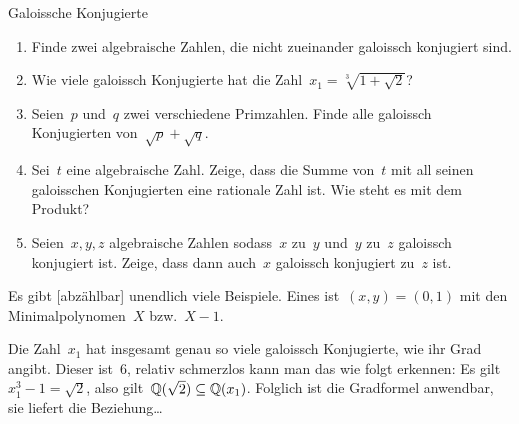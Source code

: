 \documentclass{algblatt}
\begin{document}
\begin{aufgabe}{Galoissche Konjugierte}
\begin{enumerate}
\item Finde zwei algebraische Zahlen, die nicht zueinander galoissch konjugiert
sind.
\item Wie viele galoissch Konjugierte hat die Zahl~$x_1 = \sqrt[3]{1 +
\sqrt{2}}$?
\item Seien~$p$ und~$q$ zwei verschiedene Primzahlen. Finde alle galoissch
Konjugierten von~$\sqrt{p} + \sqrt{q}$.
\item Sei~$t$ eine algebraische Zahl. Zeige, dass die Summe von~$t$ mit all
seinen galoisschen Konjugierten eine rationale Zahl ist. Wie steht es mit dem
Produkt?
\item Seien~$x, y, z$ algebraische Zahlen sodass~$x$ zu~$y$ und~$y$ zu~$z$
galoissch konjugiert ist. Zeige, dass dann auch~$x$ galoissch konjugiert zu~$z$
ist.
\end{enumerate}

\begin{loesungE}
\item Es gibt [abzählbar] unendlich viele Beispiele. Eines ist~$(x,y) = (0,1)$
mit den Minimalpolynomen~$X$ bzw.~$X-1$.

\item Die Zahl~$x_1$ hat insgesamt genau so viele galoissch Konjugierte, wie
ihr Grad angibt. Dieser ist~$6$, relativ schmerzlos kann man das wie folgt
erkennen: Es gilt~$x_1^3 - 1 = \sqrt{2}$, also gilt~$\mathbb{Q}(\sqrt{2}) \subseteq
\mathbb{Q}(x_1)$. Folglich ist die Gradformel anwendbar, sie liefert die
Beziehung\ldots
\end{loesungE}
\end{aufgabe}
\end{document}

